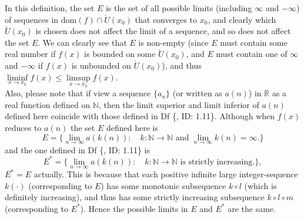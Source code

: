 \documentclass{article}
\begin{document}
\begin{Rmk}{}
    In this definition, the set $E$ is the set of all possible limits (including $\infty$ and $-\infty$) of sequences in $\text{dom}(f)\cap\check{U}(x_0)$ that converges to $x_0$, and clearly which $\check{U}(x_0)$ is chosen does not affect the limit of a sequence, and so does not affect the set $E$. \textcolor{Th}{We can clearly see that $E$ is non-empty (since $E$ must contain some real number if $f(x)$ is bounded on some $\check{U}(x_0)$, and $E$ must contain one of $\infty$ and $-\infty$ if $f(x)$ is unbounded on $\check{U}(x_0)$), and thus $\liminf\limits_{x\to x_0} f(x)\leq \limsup\limits_{x\to x_0} f(x)$.}\\
    Also, please note that if view a sequence $\{a_n\}$ (or written as $a(n)$) in $\mathbb{R}$ as a real function defined on $\mathbb{N}$, then \textcolor{Th}{the limit superior and limit inferior of $a(n)$ defined here coincide with those defined in Df \{, ID: 1.11\}.} Although when $f(x)$ reduces to $a(n)$ the set $E$ defined here is 
    $$E = \{\lim\limits_{n\to\infty} a(k(n)): \quad k: \mathbb{N}\rightarrow\mathbb{N}\text{ and }\lim\limits_{n\to\infty} k(n) = \infty.\}$$
    and the one defined in Df \{, ID: 1.11\} is
    $$E^\ast = \{\lim\limits_{n\to\infty} a(k(n)): \quad k: \mathbb{N}\rightarrow\mathbb{N}\text{ is strictly increasing.}\},$$
    $E^\ast = E$ actually. This is because that each positive infinite large integer-sequence $k(\cdot)$ (corresponding to $E$) has some monotonic subsequence $k\circ l$ (which is definitely increasing), and thus has some strictly increasing subsequence $k\circ l\circ m$ (corresponding to $E^\ast$). Hence the possible limits in $E$ and $E^\ast$ are the same.
\end{Rmk}
\end{document}

